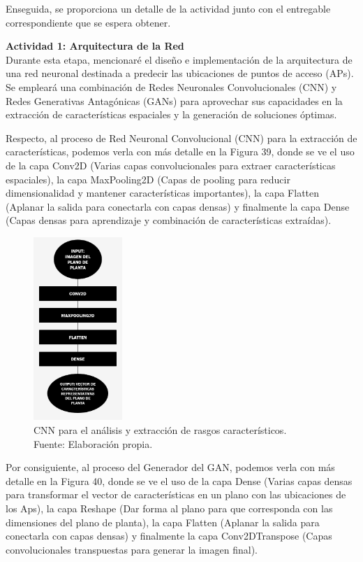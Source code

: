 Enseguida, se proporciona un detalle de la actividad junto con el entregable correspondiente que se espera obtener.

\textbf{Actividad 1: Arquitectura de la Red}
\\
Durante esta etapa, mencionaré el diseño e implementación de la arquitectura de una red neuronal destinada a predecir las ubicaciones de puntos de acceso (APs). Se empleará una combinación de Redes Neuronales Convolucionales (CNN) y Redes Generativas Antagónicas (GANs) para aprovechar sus capacidades en la extracción de características espaciales y la generación de soluciones óptimas.

Respecto, al proceso de Red Neuronal Convolucional (CNN) para la extracción de características, podemos verla con más detalle en la Figura 39, donde se ve el uso de la capa Conv2D (Varias capas convolucionales para extraer características espaciales), la capa MaxPooling2D (Capas de pooling para reducir dimensionalidad y mantener características importantes), la capa Flatten (Aplanar la salida para conectarla con capas densas) y finalmente la capa Dense (Capas densas para aprendizaje y combinación de características extraídas).

\begin{figure}[H]
	\centering
	\includegraphics[width=0.3\textwidth]{3/figures/CNN_redneuro.jpg}
	\caption[CNN para el análisis y extracción de rasgos característicos]{CNN para el análisis y extracción de rasgos característicos.\\ Fuente: Elaboración propia.}
	\label{3:4}
\end{figure}


Por consiguiente, al proceso del Generador del GAN, podemos verla con más detalle en la Figura 40, donde se ve el uso de la capa Dense (Varias capas densas para transformar el vector de características en un plano con las ubicaciones de los Aps), la capa Reshape (Dar forma al plano para que corresponda con las dimensiones del plano de planta), la capa Flatten (Aplanar la salida para conectarla con capas densas) y finalmente la capa Conv2DTranspose (Capas convolucionales transpuestas para generar la imagen final).

